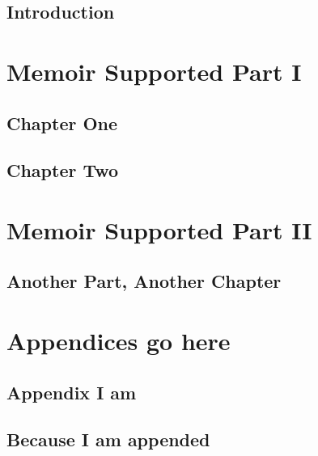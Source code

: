 \documentclass[
  a4paper, %
  11pt, %
  twoside,    %
  onecolumn,  %
  openright,  %
]{memoir}
\title{$1}
\author{$2}
\begin{document}
\frontmatter

\maketitle

\begin{abstract}
\lipsum[1-2]
\end{abstract}
\clearpage

\tableofcontents*
\clearpage

\chapter*[Intro Heading]{Introduction}

\lipsum[1-12]

\mainmatter

\part{Memoir Supported Part I}

\chapter[Chapter 1 TOC entry][Chapter One Heading]{Chapter One}

\lipsum[1-13] 

\chapter{Chapter Two}

\lipsum[1-14]

\part{Memoir Supported Part II}

\chapter{Another Part, Another Chapter}

\lipsum[1-14]

\appendix

\part{Appendices go here}

\chapter{Appendix I am}

\lipsum[1-9]

\chapter{Because I am appended}

\lipsum[1-11]

\backmatter


% 
% 
\end{document}
